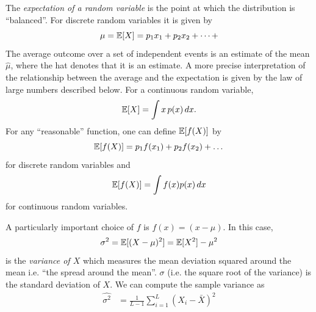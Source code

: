 The  \emph{expectation
  of a random variable} is the point at which the distribution is
``balanced''. For discrete random variables it is given by 
\begin{equation}
\mu = \mathbb{E}[X]=p_1x_1+p_2x_2+\dots + 
\end{equation} 
The average outcome 
over a set of independent
events is an estimate of the mean $\hat{\mu}$, where the hat denotes
that it is an estimate. A more precise interpretation of the
relationship between the average and the expectation is given by the law of large numbers described below. For a continuous random variable, 
\begin{equation}
\mathbb{E}[X]=\int x\,p(x)\,dx.
\end{equation}
For any ``reasonable'' function, one can define $\mathbb{E}[f(X)]$ by %
\begin{equation}
\mathbb{E}[f(X)]=p_1f(x_1)+p_2 f(x_2)+\dots
\end{equation}
for discrete random variables and 
\begin{equation}
\mathbb{E}[f(X)]=\int f(x)p(x)\,dx
\end{equation}
for continuous random variables. 

A particularly important choice of $f$ is $f(x)=(x-\mu)$. In this case, 
\begin{equation}
\sigma^2 = \mathbb{E}[(X-\mu)^2]= \mathbb{E}[X^2]-\mu^2
\end{equation}
is the  \emph{variance of $X$} which measures the mean deviation
squared around the mean i.e. ``the spread around the mean''. $\sigma$
(i.e. the square root of the variance) is the standard deviation of
$X$.
We can compute the sample variance as
\begin{align}
  \widehat{\sigma^2}  &= \frac{1}{L-1} \sum_{i=1}^L (X_i -
                        \bar{X})^2 \label{eqn:sample_var} %
  \end{align}


